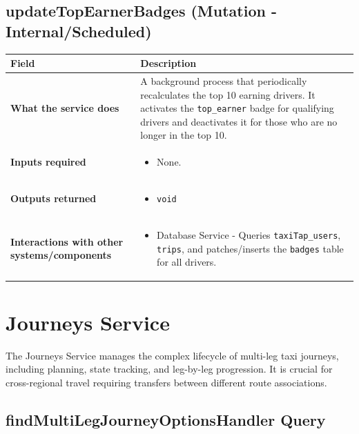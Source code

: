 \documentclass[11pt,a4paper]{article}
\begin{document}
\subsection{updateTopEarnerBadges (Mutation - Internal/Scheduled)}
\label{sub:updateTopEarnerBadges}
\begin{longtable}{|p{4cm}|p{12cm}|}
\hline
\textbf{Field} & \textbf{Description} \\
\hline
\textbf{What the service does} & 
A background process that periodically recalculates the top 10 earning drivers. It activates the \texttt{top\_earner} badge for qualifying drivers and deactivates it for those who are no longer in the top 10. \\
\hline
\textbf{Inputs required} & 
\begin{itemize}[nosep]
\item None.
\end{itemize} \\
\hline
\textbf{Outputs returned} & 
\begin{itemize}[nosep]
\item \texttt{void}
\end{itemize} \\
\hline
\textbf{Interactions with other systems/components} & 
\begin{itemize}[nosep]
\item Database Service - Queries \texttt{taxiTap\_users}, \texttt{trips}, and patches/inserts the \texttt{badges} table for all drivers.
\end{itemize} \\
\hline
\end{longtable}

\section{Journeys Service}

The Journeys Service manages the complex lifecycle of multi-leg taxi journeys, including planning, state tracking, and leg-by-leg progression. It is crucial for cross-regional travel requiring transfers between different route associations.

\subsection{findMultiLegJourneyOptionsHandler Query}
\end{document}
